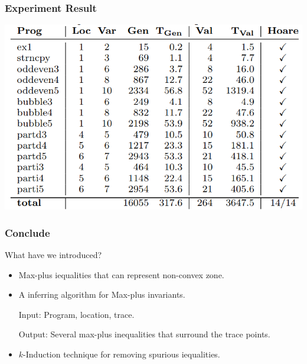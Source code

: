 \documentclass[11pt]{beamer}
\begin{document}
\begin{frame}\frametitle{Experiment Result}
\begin{center}
\includegraphics[scale=0.4]{12.png}
\end{center}
\end{frame}

\begin{frame}\frametitle{Conclude}
What have we introduced?
\begin{itemize}
\item Max-plus iequalities that can represent non-convex zone.
\item A inferring algorithm for Max-plus invariants.

Input: Program, location, trace.

Output: Several max-plus inequalities that surround the trace points.
\item $k$-Induction technique for removing spurious iequalities.
\end{itemize}
\end{frame}
\end{document}

